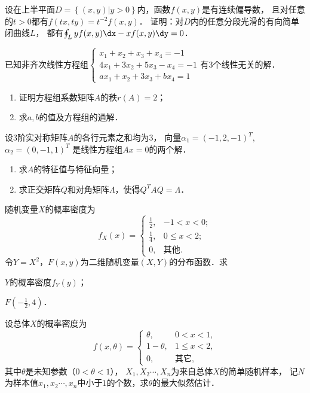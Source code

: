 \documentclass[plain,noanswer,medmath]{../../template/jnuexam}
\begin{document}
\begin{problem}[points=12]
设在上半平面$D = \left\{(x,y) \big| y > 0\right\}$内，函数$f(x,y)$是有连续偏导数，
且对任意的$t > 0$都有$f(tx,ty) = t^{-2} f(x,y)$．
证明：对$D$内的任意分段光滑的有向简单闭曲线$L$，
都有$\oint_L y f(x,y)\dx - xf(x,y)\dy = 0$．
\end{problem}


\begin{problem}[points=9]
已知非齐次线性方程组$\begin{cases}
  x_1 + x_2 + x_3 + x_4 = - 1 \\
  4x_1 + 3x_2 + 5x_3 - x_4 = - 1 \\
  ax_1 + x_2 + 3x_3 + bx_4 = 1
\end{cases}$有$3$个线性无关的解．
\begin{enumerate}
\item 证明方程组系数矩阵$A$的秩$r(A) = 2$；
\item 求$a,b$的值及方程组的通解．
\end{enumerate}
\end{problem}


\begin{problem}[points=9]
设$3$阶实对称矩阵$A$的各行元素之和均为$3$，
向量$\alpha_1 = \left(- 1,2, - 1 \right)^T$,$\alpha_2 = \left(0, - 1,1 \right)^T$
是线性方程组$Ax = 0$的两个解．
\begin{enumerate}
\item 求$A$的特征值与特征向量；
\item 求正交矩阵$Q$和对角矩阵$\Lambda$，使得$Q^T AQ = \Lambda$．
\end{enumerate}
\end{problem}


\begin{problem}[points=9]
随机变量$X$的概率密度为
$$f_X(x) = \begin{cases}
  \frac{1}{2}, & -1 < x < 0; \\
  \frac{1}{4}, & 0 \le x < 2; \\
            0, & \text{其他}.
\end{cases}$$
$\text{令}Y = X^2$，$F\left(x,y \right)$为二维随机变量$(X,Y)$的分布函数．求\par
\begin{enumerate*}
\item $Y$的概率密度$f_Y(y)$；
\item $F\left(-\frac{1}{2},4\right)$．
\end{enumerate*}
\end{problem}


\begin{problem}[points=9]
设总体$X$的概率密度为
$$f(x,\theta) = \begin{cases}
      \theta , & 0 < x < 1, \\
  1 - \theta , & 1 \le x < 2, \\
            0, & \text{其它},
\end{cases}$$
其中$\theta$是未知参数（$0 < \theta < 1$），
$X_1,X_2\cdots ,X_{n}$为来自总体$X$的简单随机样本，
记$N$为样本值$x_1,x_2\cdots ,x_n$中小于$1$的个数，求$\theta$的最大似然估计．
\end{problem}
\end{document}
